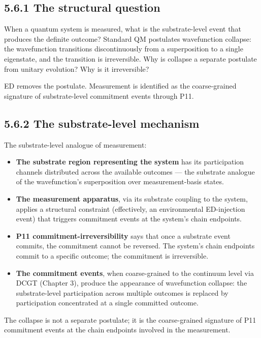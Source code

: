\documentclass[11pt]{book}
\begin{document}
\subsection{5.6.1 The structural question}

When a quantum system is measured, what is the substrate-level event that produces the definite outcome? Standard QM postulates wavefunction collapse: the wavefunction transitions discontinuously from a superposition to a single eigenstate, and the transition is irreversible. Why is collapse a separate postulate from unitary evolution? Why is it irreversible?

ED removes the postulate. Measurement is identified as the coarse-grained signature of substrate-level commitment events through P11.

\subsection{5.6.2 The substrate-level mechanism}

The substrate-level analogue of measurement:

\begin{itemize}
\item \textbf{The substrate region representing the system} has its participation channels distributed across the available outcomes — the substrate analogue of the wavefunction's superposition over measurement-basis states.
\item \textbf{The measurement apparatus}, via its substrate coupling to the system, applies a structural constraint (effectively, an environmental ED-injection event) that triggers commitment events at the system's chain endpoints.
\item \textbf{P11 commitment-irreversibility} says that once a substrate event commits, the commitment cannot be reversed. The system's chain endpoints commit to a specific outcome; the commitment is irreversible.
\item \textbf{The commitment events}, when coarse-grained to the continuum level via DCGT (Chapter 3), produce the appearance of wavefunction collapse: the substrate-level participation across multiple outcomes is replaced by participation concentrated at a single committed outcome.
\end{itemize}

The collapse is not a separate postulate; it is the coarse-grained signature of P11 commitment events at the chain endpoints involved in the measurement.
\end{document}

